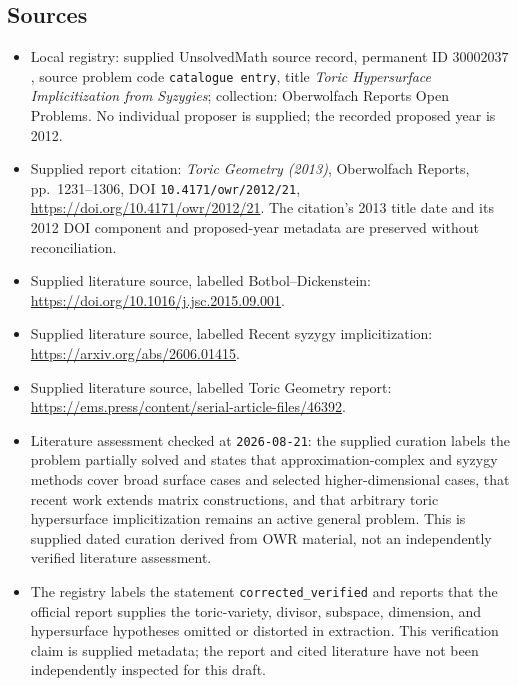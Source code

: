 \documentclass[11pt]{article}
\begin{document}
\subsection{Sources}
\begin{itemize}
\item Local registry: supplied UnsolvedMath source record, permanent ID \(30002037\), source problem code \texttt{catalogue entry}, title \emph{Toric Hypersurface Implicitization from Syzygies}; collection: Oberwolfach Reports Open Problems. No individual proposer is supplied; the recorded proposed year is 2012.
\item Supplied report citation: \emph{Toric Geometry (2013)}, Oberwolfach Reports, pp.\ 1231--1306, DOI \texttt{10.4171/owr/2012/21}, \url{https://doi.org/10.4171/owr/2012/21}. The citation's 2013 title date and its 2012 DOI component and proposed-year metadata are preserved without reconciliation.
\item Supplied literature source, labelled Botbol--Dickenstein: \url{https://doi.org/10.1016/j.jsc.2015.09.001}.
\item Supplied literature source, labelled Recent syzygy implicitization: \url{https://arxiv.org/abs/2606.01415}.
\item Supplied literature source, labelled Toric Geometry report: \url{https://ems.press/content/serial-article-files/46392}.
\item Literature assessment checked at \texttt{2026-08-21}: the supplied curation labels the problem partially solved and states that approximation-complex and syzygy methods cover broad surface cases and selected higher-dimensional cases, that recent work extends matrix constructions, and that arbitrary toric hypersurface implicitization remains an active general problem. This is supplied dated curation derived from OWR material, not an independently verified literature assessment.
\item The registry labels the statement \texttt{corrected\_verified} and reports that the official report supplies the toric-variety, divisor, subspace, dimension, and hypersurface hypotheses omitted or distorted in extraction. This verification claim is supplied metadata; the report and cited literature have not been independently inspected for this draft.
\end{itemize}
\end{document}
